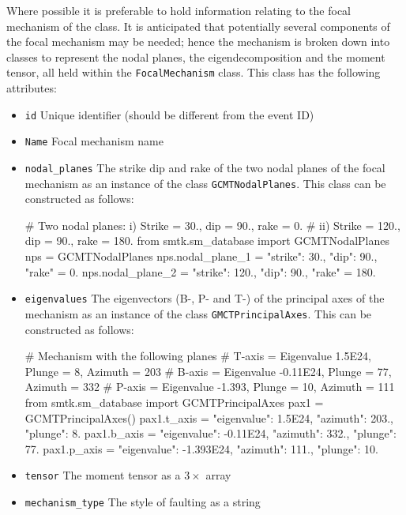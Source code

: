 Where possible it is preferable to hold information relating to the focal mechanism of the class. It is anticipated that potentially several components of the focal mechanism may be needed; hence the mechanism is broken down into classes to represent the nodal planes, the eigendecomposition and the moment tensor, all held within the \verb=FocalMechanism= class. This class has the following attributes:
\begin{itemize}
\item \verb=id= Unique identifier (should be different from the event ID)
\item \verb=Name= Focal mechanism name
\item \verb=nodal_planes= The strike dip and rake of the two nodal planes of the focal mechanism as an instance of the class \verb=GCMTNodalPlanes=. This class can be constructed as follows:
\begin{python}
# Two nodal planes: i) Strike = 30., dip = 90., rake = 0.
#                  ii) Strike = 120., dip = 90., rake = 180.
from smtk.sm_database import GCMTNodalPlanes
nps = GCMTNodalPlanes
nps.nodal_plane_1 = {"strike": 30., "dip": 90., "rake" = 0.}
nps.nodal_plane_2 = {"strike": 120., "dip": 90., "rake" = 180.}
\end{python}
 \item \verb=eigenvalues= The eigenvectors (B-, P- and T-) of the principal axes of the mechanism as an instance of the class \verb=GMCTPrincipalAxes=. This can be constructed as follows:
 \begin{python}[frame=single]
 # Mechanism with the following planes
 # T-axis = Eigenvalue 1.5E24, Plunge = 8, Azimuth = 203
 # B-axis = Eigenvalue -0.11E24, Plunge = 77, Azimuth = 332
 # P-axis = Eigenvalue -1.393, Plunge = 10, Azimuth = 111
 from smtk.sm_database import GCMTPrincipalAxes
 pax1 = GCMTPrincipalAxes()
 pax1.t_axis = {"eigenvalue": 1.5E24,
                "azimuth": 203.,
                "plunge": 8.}
 pax1.b_axis = {"eigenvalue": -0.11E24,
                "azimuth": 332.,
                "plunge": 77.}
 pax1.p_axis = {"eigenvalue": -1.393E24,
                "azimuth": 111.,
                "plunge": 10.}
 \end{python}
 \item \verb=tensor= The moment tensor as a $3 \times $ array
 \item \verb=mechanism_type= The style of faulting as a string
\end{itemize}

